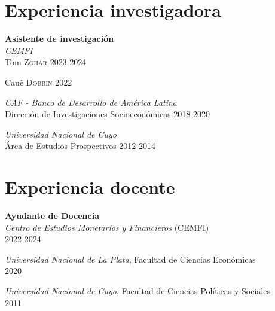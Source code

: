 \documentclass[margin,center,a4paper]{res}
\begin{document}
\begin{resume}
		\section{Experiencia investigadora}
		
		\textbf{Asistente de investigación} \\
		{\sl CEMFI} \\
		\hspace*{0.3in} Tom \textsc{Zohar} \hfill 2023-2024\vspace{-0.75em}
		
		\hspace*{0.3in} Cauê \textsc{Dobbin} \hfill 2022\vspace{-0.75em}
		
		{\sl CAF - Banco de Desarrollo de América Latina} \\
		\hspace*{0.3in} Dirección de Investigaciones Socioeconómicas \hfill 2018-2020\vspace{-0.75em}
		
		{\sl Universidad Nacional de Cuyo} \\
		\hspace*{0.3in} Área de Estudios Prospectivos \hfill 2012-2014
		\section{Experiencia docente}
		\textbf{Ayudante de Docencia} \\
		\textit{Centro de Estudios Monetarios y Financieros} (CEMFI) \\
		\hspace*{0.3in}   \hfill 2022-2024\vspace{-0.75em}
		
		{\sl Universidad Nacional de La Plata}, Facultad de Ciencias Económicas \\
		\hspace*{0.3in}   \hfill 2020\vspace{-0.75em}
		
		{\sl Universidad Nacional de Cuyo}, Facultad de Ciencias Políticas y Sociales \\
		\hspace*{0.3in}   \hfill 2011
		

\end{resume}
\end{document}
